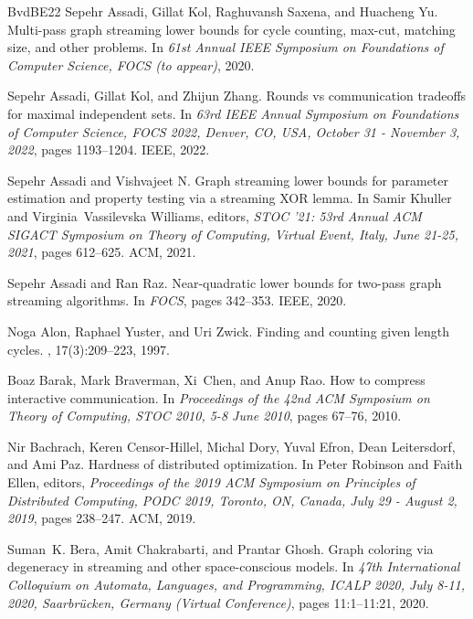 \documentclass[11pt,letterpaper]{article}
\theoremstyle{definition}
\begin{document}
\begin{thebibliography}{BvdBE{\etalchar{+}}22}
Sepehr Assadi, Gillat Kol, Raghuvansh Saxena, and Huacheng Yu.
\newblock Multi-pass graph streaming lower bounds for cycle counting, max-cut, matching size, and other problems.
\newblock In {\em 61st Annual {IEEE} Symposium on Foundations of Computer Science, {FOCS} (to appear)}, 2020.

Sepehr Assadi, Gillat Kol, and Zhijun Zhang.
\newblock Rounds vs communication tradeoffs for maximal independent sets.
\newblock In {\em 63rd {IEEE} Annual Symposium on Foundations of Computer Science, {FOCS} 2022, Denver, CO, USA, October 31 - November 3, 2022}, pages 1193--1204. {IEEE}, 2022.

Sepehr Assadi and Vishvajeet N.
\newblock Graph streaming lower bounds for parameter estimation and property testing via a streaming {XOR} lemma.
\newblock In Samir Khuller and Virginia~Vassilevska Williams, editors, {\em {STOC} '21: 53rd Annual {ACM} {SIGACT} Symposium on Theory of Computing, Virtual Event, Italy, June 21-25, 2021}, pages 612--625. {ACM}, 2021.

Sepehr Assadi and Ran Raz.
\newblock Near-quadratic lower bounds for two-pass graph streaming algorithms.
\newblock In {\em {FOCS}}, pages 342--353. {IEEE}, 2020.

Noga Alon, Raphael Yuster, and Uri Zwick.
\newblock Finding and counting given length cycles.
, 17(3):209--223, 1997.

Boaz Barak, Mark Braverman, Xi~Chen, and Anup Rao.
\newblock How to compress interactive communication.
\newblock In {\em Proceedings of the 42nd {ACM} Symposium on Theory of Computing, {STOC} 2010, 5-8 June 2010}, pages 67--76, 2010.

Nir Bachrach, Keren Censor{-}Hillel, Michal Dory, Yuval Efron, Dean Leitersdorf, and Ami Paz.
\newblock Hardness of distributed optimization.
\newblock In Peter Robinson and Faith Ellen, editors, {\em Proceedings of the 2019 {ACM} Symposium on Principles of Distributed Computing, {PODC} 2019, Toronto, ON, Canada, July 29 - August 2, 2019}, pages 238--247. {ACM}, 2019.

Suman~K. Bera, Amit Chakrabarti, and Prantar Ghosh.
\newblock Graph coloring via degeneracy in streaming and other space-conscious models.
\newblock In {\em 47th International Colloquium on Automata, Languages, and Programming, {ICALP} 2020, July 8-11, 2020, Saarbr{\"{u}}cken, Germany (Virtual Conference)}, pages 11:1--11:21, 2020.


\end{thebibliography}
\end{document}
